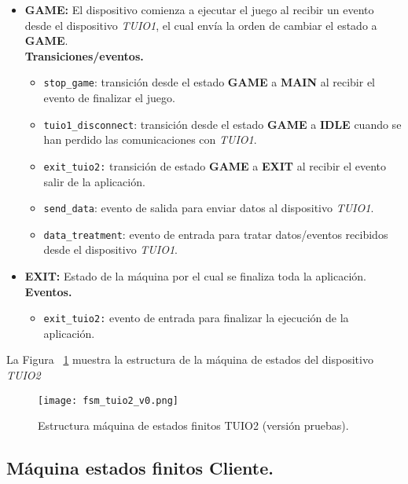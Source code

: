 \begin{itemize}
\item \textbf{GAME:} El dispositivo comienza a ejecutar el juego al recibir un evento desde el dispositivo \emph{TUIO1}, el cual envía la orden de cambiar el estado a \textbf{GAME}.\\
\textbf{Transiciones/eventos.}
\begin{itemize}
\item \texttt{stop\_game}: transición desde el estado \textbf{GAME} a \textbf{MAIN} al recibir el evento de finalizar el juego.
\item \texttt{tuio1\_disconnect}: transición desde el estado \textbf{GAME} a \textbf{IDLE} cuando se han perdido las comunicaciones con \emph{TUIO1}.
\item \texttt{exit\_tuio2:} transición de estado \textbf{GAME} a \textbf{EXIT} al recibir el evento salir de la aplicación.
\item \texttt{send\_data}: evento de salida para enviar datos al dispositivo \emph{TUIO1}.
\item \texttt{data\_treatment}: evento de entrada para tratar datos/eventos recibidos desde el dispositivo \emph{TUIO1}.
\end{itemize}


\item \textbf{EXIT:} Estado de la máquina por el cual se finaliza toda la aplicación.\\
\textbf{Eventos.}
\begin{itemize}
\item \texttt{exit\_tuio2:} evento de entrada para finalizar la ejecución de la aplicación.
\end{itemize}
\end{itemize}

La Figura ~\ref{fig:tuio2fsmv0} muestra la estructura de la máquina de estados del dispositivo \emph{TUIO2}

\begin{figure}[!h]
\begin{center}
\texttt{[image: fsm\_tuio2\_v0.png]}
\caption{Estructura máquina de estados finitos TUIO2 (versión pruebas).}
\label{fig:tuio2fsmv0}
\end{center}
\end{figure}


\subsection{Máquina estados finitos Cliente.}

